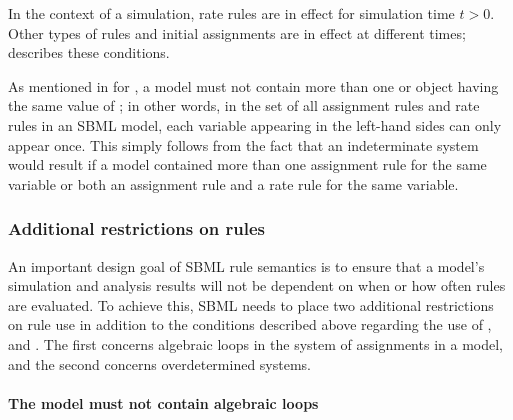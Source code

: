 
In the context of a simulation, rate rules are in effect for
simulation time $t > 0$.  Other types of rules and initial
assignments are in effect at different times;
 describes these conditions.

As mentioned in  for
\AssignmentRule, a model must not contain more than one \RateRule
or \AssignmentRule object having the same value of
; in other words, in the set of all assignment
rules and rate rules in an SBML model, each variable appearing in
the left-hand sides can only appear once.  This simply follows
from the fact that an indeterminate system would result if a model
contained more than one assignment rule for the same variable or
both an assignment rule and a rate rule for the same variable.


\subsubsection{Additional restrictions on rules}
\label{sec:ruleconstraints}

An important design goal of SBML rule semantics is to ensure that
a model's simulation and analysis results will not be dependent on
when or how often rules are evaluated.  To achieve this, SBML
needs to place two additional restrictions on rule use in addition
to the conditions described above regarding the use of
\AlgebraicRule, \AssignmentRule and \RateRule.  The first concerns
algebraic loops in the system of assignments in a model, and the
second concerns overdetermined systems.


\paragraph{The model must not contain algebraic loops}

